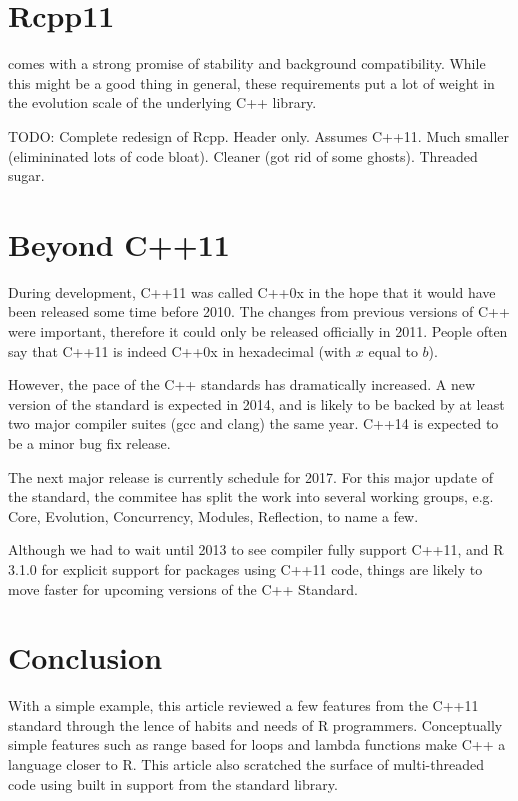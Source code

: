 \section{Rcpp11}

 comes with a strong promise of stability and 
background compatibility. While this might be a good thing in general, 
these requirements put a lot of weight in the evolution scale of the 
underlying C++ library. 

TODO: 
Complete redesign of Rcpp. 
Header only. Assumes C++11.
Much smaller (elimininated lots of code bloat). 
Cleaner (got rid of some ghosts). 
Threaded sugar. 

\section{Beyond C++11}

During development, C++11 was called C++0x in the hope that it would have been 
released some time before 2010. The changes from previous versions of C++
were important, therefore it could only be released officially in 2011. People
often say that C++11 is indeed C++0x in hexadecimal (with $x$ equal to $b$). 

However, the pace of the C++ standards has dramatically increased. A new version
of the standard is expected in 2014, and is likely to be backed by at least 
two major compiler suites (gcc and clang) the same year. C++14 is expected to
be a minor bug fix release. 

The next major release is currently schedule for 2017. For this major 
update of the standard, the commitee has split the work into several 
working groups, e.g. Core, Evolution, Concurrency, Modules, Reflection, to name
a few. 

Although we had to wait until 2013 to see compiler fully support C++11, and
R 3.1.0 for explicit support for packages using C++11 code, things are likely 
to move faster for upcoming versions of the C++ Standard. 

\section{Conclusion}

With a simple example, this article reviewed a few features from
the C++11 standard through the lence of habits and needs of R programmers. 
Conceptually simple features such as range based for loops and lambda functions
make C++ a language closer to R. This article also scratched the surface
of multi-threaded code using built in support from the standard library. 


